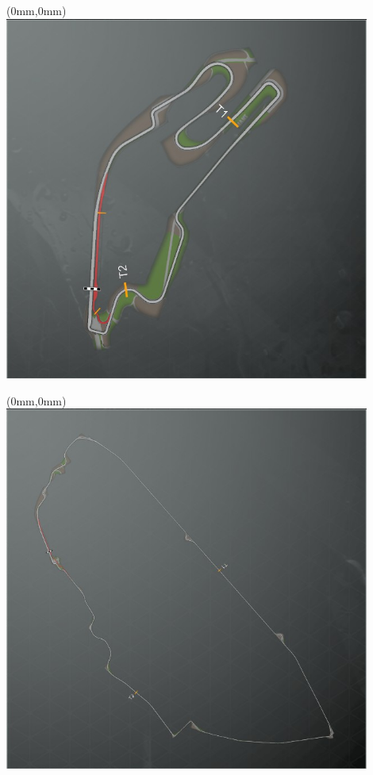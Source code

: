 \null\newpage
\begin{textblock*}{30mm}(0mm,0mm)%
\includegraphics[width=120mm]{TR/2015-05-20_00032.png}
\end{textblock*}
\null\newpage
\begin{textblock*}{30mm}(0mm,0mm)%
\includegraphics[width=120mm]{TR/2015-05-20_00031.png}
\end{textblock*}
